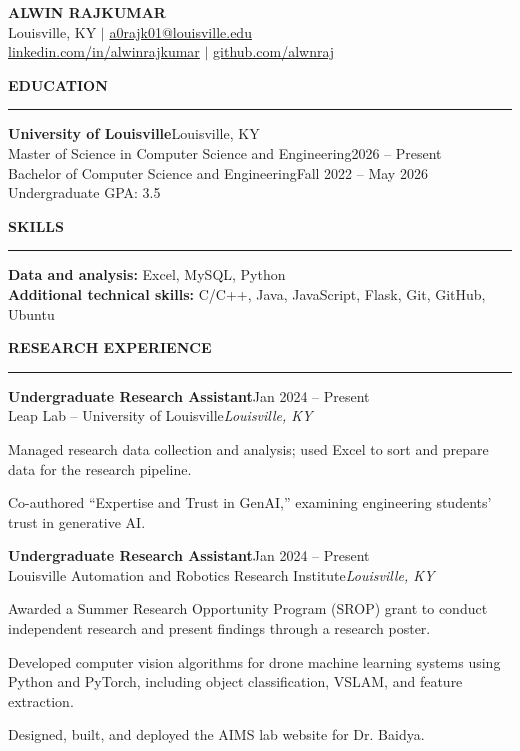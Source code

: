 \documentclass[11pt,letterpaper]{article}
\renewenvironment{itemize}{%
  \begin{list}{\textbullet}{%
    \setlength{\leftmargin}{1.4em}%
    \setlength{\topsep}{5pt}%
    \setlength{\itemsep}{4pt}%
    \setlength{\parsep}{0pt}%
    \setlength{\partopsep}{0pt}}%
}{\end{list}}
\newcommand{\resumesection}[1]{%
  \par\addvspace{12pt}%
  {\large\bfseries #1}\par\vspace{3pt}\hrule\vspace{6pt}}
\newcommand{\role}[4]{%
  \textbf{#1}\hfill #2\\%
  #3\hfill\textit{#4}\par}
\begin{document}
\begin{center}
  {\LARGE\bfseries ALWIN RAJKUMAR}\\[4pt]
  Louisville, KY \enspace $\vert$ \enspace
  \href{mailto:a0rajk01@louisville.edu}{a0rajk01@louisville.edu}\\[3pt]
  \href{https://www.linkedin.com/in/alwinrajkumar/}{linkedin.com/in/alwinrajkumar}
  \enspace $\vert$ \enspace
  \href{https://github.com/alwnraj}{github.com/alwnraj}
\end{center}
\vspace{-7pt}

\resumesection{EDUCATION}
\textbf{University of Louisville}\hfill Louisville, KY\\[3pt]
Master of Science in Computer Science and Engineering\hfill 2026 -- Present\\[3pt]
Bachelor of Computer Science and Engineering\hfill Fall 2022 -- May 2026\\[3pt]
Undergraduate GPA: 3.5

\resumesection{SKILLS}
\textbf{Data and analysis:} Excel, MySQL, Python\\[3pt]
\textbf{Additional technical skills:} C/C++, Java, JavaScript, Flask, Git, GitHub, Ubuntu

\resumesection{RESEARCH EXPERIENCE}
\role{Undergraduate Research Assistant}{Jan 2024 -- Present}
  {Leap Lab -- University of Louisville}{Louisville, KY}
\begin{itemize}
  \item Managed research data collection and analysis; used Excel to sort and prepare data for the research pipeline.
  \item Co-authored ``Expertise and Trust in GenAI,'' examining engineering students' trust in generative AI.
\end{itemize}
\vspace{4pt}
\role{Undergraduate Research Assistant}{Jan 2024 -- Present}
  {Louisville Automation and Robotics Research Institute}{Louisville, KY}
\begin{itemize}
  \item Awarded a Summer Research Opportunity Program (SROP) grant to conduct independent research and present findings through a research poster.
  \item Developed computer vision algorithms for drone machine learning systems using Python and PyTorch, including object classification, VSLAM, and feature extraction.
  \item Designed, built, and deployed the AIMS lab website for Dr. Baidya.
\end{itemize}
\end{document}
